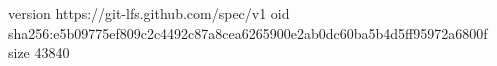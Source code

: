 version https://git-lfs.github.com/spec/v1
oid sha256:e5b09775ef809c2c4492c87a8cea6265900e2ab0dc60ba5b4d5ff95972a6800f
size 43840
